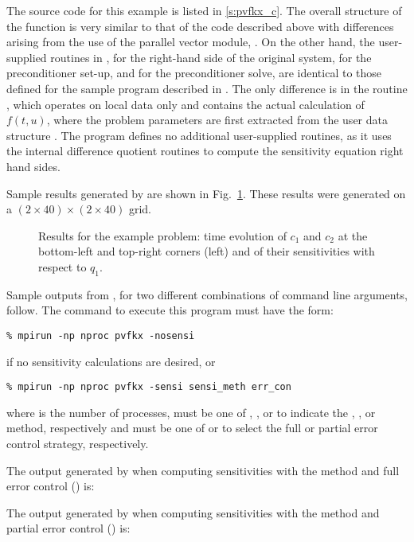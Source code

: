 The source code for this example is listed in \A\ref{s:pvfkx_c}.
The overall structure of the  function is very
similar to that of the code  described above with 
differences arising from the use of the parallel vector module, {\nvecp}.
On the other hand, the user-supplied routines in ,
 for the right-hand side of the original system,
 for the preconditioner set-up, and  for the
preconditioner solve, are identical to those defined for the sample program
 described in \cite{cvode2.2.0_ex}. The only difference is in the
routine , which operates on local data only and contains the actual 
calculation of $f(t,u)$, where the problem parameters are first extracted from
the user data structure . The program  defines no additional
user-supplied routines, as it uses the {\cvodes} internal difference quotient routines 
to compute the sensitivity equation right hand sides.

Sample results generated by  are shown in Fig.~\ref{f:pvfkx}. 
These results were generated on a $(2\times40)\times(2\times40)$ grid.
\begin{figure}
  {\centerline{}}
  \caption{Results for the  example problem:
    time evolution of $c_1$ and $c_2$ at the bottom-left and top-right corners
    (left) and of their sensitivities with respect to $q_1$.}
  \label{f:pvfkx}
\end{figure}

Sample outputs from , for two different combinations of command line arguments, 
follow. The command to execute this program must have the form:
\begin{verbatim}
% mpirun -np nproc pvfkx -nosensi
\end{verbatim} 
if no sensitivity calculations are desired, or
\begin{verbatim}
% mpirun -np nproc pvfkx -sensi sensi_meth err_con
\end{verbatim}
where  is the number of processes,  must be one of , 
, or  to
indicate the , , or  method,
respectively and  must be one of  or  to
select the full or partial error control strategy, respectively.

The output generated by  when computing sensitivities with the 
method and full error control () is:


The output generated by  when computing sensitivities with the 
method and partial error control () is:


